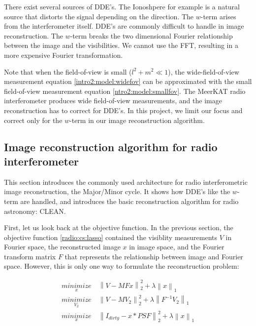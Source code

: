There exist several sources of DDE's. The Ionoshpere for example is a natural source that distorts the signal depending on the direction. The $w$-term arises from the interferometer itself. DDE's are commonly difficult to handle in image reconstruction. The $w$-term breaks the two dimensional Fourier relationship between the image and the visibilities. We cannot use the FFT, resulting in a more expensive Fourier transformation.

Note that when the field-of-view is small ($l^2 +m^2 \ll 1$), the wide-field-of-view measurement equation \eqref{intro2:model:widefov} can be approximated with the small field-of-view measurement equation \eqref{ntro2:model:smallfov}. The MeerKAT radio interferometer produces wide field-of-view measurements, and the image reconstruction has to correct for DDE's. In this project, we limit our focus and correct only for the $w$-term in our image reconstruction algorithm. 


\subsection{Image reconstruction algorithm for radio interferometer}\label{intro2:rec}
This section introduces the commonly used architecture for radio interferometric image reconstruction, the Major/Minor cycle. It shows how DDE's like the $w$-term are handled, and introduces the basic reconstruction algorithm for radio astronomy: CLEAN.

First, let us look back at the objective function. In the previous section, the objective function \eqref{radio:cs:lasso} contained the visiblity measurements $V$ in Fourier space, the reconstructed image $x$ in image space, and the Fourier transform matrix $F$ that represents the relationship between image and Fourier space. However, this is only one way to formulate the reconstruction problem:

\begin{equation} \label{radio:rec:objective}
\begin{split}
\underset{x}{minimize} &\: \left \| V - MFx \right \|_2^2 + \lambda \left \| x \right \|_1 \\
\underset{V_2}{minimize} &\: \left \| V - MV_2 \right \|_2^2 + \lambda \left \| F^{-1}V_2 \right \|_1 \\
\underset{x}{minimize} &\: \left \| I_{dirty} - x * PSF \right \|_2^2 + \lambda \left \| x \right \|_1
\end{split}
\end{equation}

